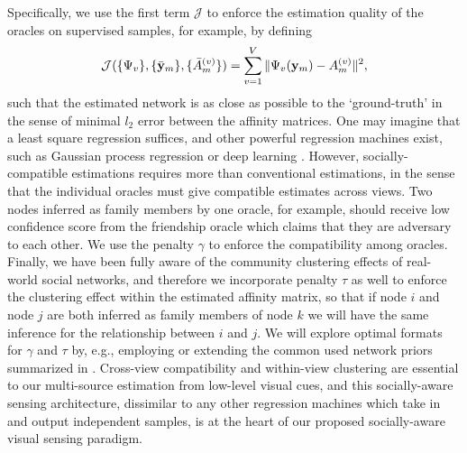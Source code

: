 Specifically, we use the first term $\mathcal{J}$ to enforce the estimation quality of the oracles on supervised samples, for example, by defining
\begin{equation}\label{eq:L2error}
\mathcal{J}(\{\Psi_{v}\}, \{\bar{{\bf y}}_m\}, \{\bar{A}^{(v)}_m\})=\sum_{v=1}^{V}\|\Psi_{v}({\bf y}_m)-A^{(v)}_m\|^{2},
 \end{equation}
such that the estimated network is as close as possible to the `ground-truth' in the sense of minimal $l_2$ error between the affinity matrices. One may imagine that a least square regression suffices, and other powerful regression machines exist, such as Gaussian process regression \cite{GPbook} or deep learning \cite{DLbook}. However, socially-compatible estimations requires more than conventional estimations, in the sense that the individual oracles must give compatible estimates across views. Two nodes inferred as family members by one oracle, for example, should receive low confidence score from the friendship oracle which claims that they are adversary to each other. We use the penalty $\gamma$ to enforce the compatibility among oracles. Finally, we have been fully aware of the community clustering effects of real-world social networks, and therefore we incorporate penalty $\tau$ as well to enforce the clustering effect within the estimated affinity matrix, so that if node $i$ and node $j$ are both inferred as family members of node $k$ we will have the same inference for the relationship between $i$ and $j$. We will explore optimal formats for $\gamma$ and $\tau$ by, e.g., employing or extending the common used network priors summarized in \cite{Goldenberg}. Cross-view compatibility and within-view clustering are essential to our multi-source estimation from low-level visual cues, and this socially-aware sensing architecture, dissimilar to any other regression machines which take in and output independent samples, is at the heart of our proposed socially-aware visual sensing paradigm.








